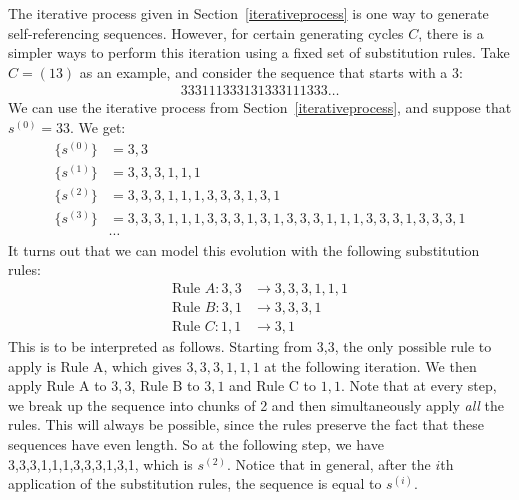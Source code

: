 \documentclass[runningheads,a4paper]{llncs}
\begin{document}
The iterative process given in Section~\ref{iterativeprocess} is one way to generate self-referencing sequences. However, for certain generating cycles $C$, there is a simpler ways to perform this iteration using a fixed set of substitution rules. Take $C = (1 3)$ as an example, and consider the sequence that starts with a 3:
\begin{align*}
333111333131333111333\dots
\end{align*}
We can use the iterative process from Section~\ref{iterativeprocess}, and suppose that $s^{(0)} = 33$. We get:
\begin{align*}
\{s^{(0)}\} &= 3,3\\
\{s^{(1)}\} &= 3,3,3,1,1,1\\
\{s^{(2)}\} &= 3,3,3,1,1,1,3,3,3,1,3,1\\
\{s^{(3)}\} &= 3,3,3,1,1,1,3,3,3,1,3,1,3,3,3,1,1,1,3,3,3,1,3,3,3,1\\
&\cdots
\end{align*}
It turns out that we can model this evolution with the following substitution rules:
\begin{align*}
\text{Rule }A: 3,3 &\to 3,3,3,1,1,1 \\
\text{Rule }B: 3,1 &\to 3,3,3,1\\
\text{Rule }C: 1,1 &\to 3,1
\end{align*}
This is to be interpreted as follows. Starting from 3,3, the only possible rule to apply is Rule A, which gives $3,3,3,1,1,1$ at the following iteration. We then apply Rule A to $3,3$, Rule B to $3,1$ and Rule C to $1,1$. Note that at every step, we break up the sequence into chunks of 2 and then simultaneously apply \emph{all} the rules. This will always be possible, since the rules preserve the fact that these sequences have even length. So at the following step, we have 3,3,3,1,1,1,3,3,3,1,3,1, which is $s^{(2)}$. Notice that in general, after the $i$th application of the substitution rules, the sequence is equal to $s^{(i)}$.
\end{document}
